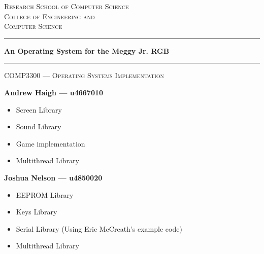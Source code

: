 \documentclass[twoside,a4paper]{article}
\begin{document}
\begin{titlepage}
 
\begin{center}

\textsc{\Large Research School of Computer Science}\\[0.5cm]
\textsc{\Large College of Engineering and}\\[0.2cm]
\textsc{\Large Computer Science}\\[0.5cm]


 
\vspace{1.4cm}

\hrule

\vspace{1.4cm}

{ \huge \bfseries An Operating System for the Meggy Jr. RGB}
\vspace{1.4cm}
\hrule
\vspace{1.0cm}

\textsc{\large COMP3300 --- Operating Systems Implementation}

\vspace{1.0cm}

\vspace{1.0cm}
{ \Large \bfseries Andrew Haigh --- u4667010}
\begin{itemize}
\item Screen Library
\item Sound Library
\item Game implementation
\item Multithread Library
\end{itemize}
\vspace{1.0cm}
{ \Large \bfseries Joshua Nelson --- u4850020}
\begin{itemize}
 \item EEPROM Library
 \item Keys Library
 \item Serial Library (Using Eric McCreath's example code)
 \item Multithread Library
\end{itemize}
\vfill
\begin{abstract}
A rudimentary operating system for the Meggy Jr. RGB, a handheld device based on the Atmel AVR architecture. A library useful to game developers was created, including functions for interacting with the screen, sound, keys, memory, I/O, and multithreading.
\end{abstract}
 
\end{center}

\end{titlepage}
\end{document}
